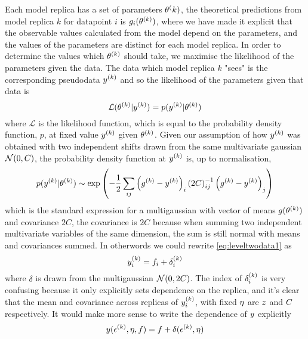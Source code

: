 Each model replica has a set of parameters $\theta^(k)$, the theoretical
predictions from model replica $k$ for datapoint $i$ is
$g_{i}(\theta^{(k)})$, where we have made it explicit that the observable
values calculated from the model depend on the parameters, and the values of the
parameters are distinct for each model replica. In order to determine the values
which $\theta^{(k)}$ should take, we maximise the likelihood of the parameters
given the data. The data which model replica $k$ "sees" is the corresponding
pseudodata $y^{(k)}$ and so the likelihood of the parameters given
that data is
\begin{equation}
    \mathcal{L}(\theta^{(k)} \vert y^{(k)}) = p(y^{(k)} | \theta^{(k)})
\end{equation}
where $\mathcal{L}$ is the likelihood function, which is equal to the probability
density function, $p$, at fixed value $y^{(k)}$ given
$\theta^{(k)}$. Given our assumption of how $y^{(k)}$ was obtained
with two independent shifts drawn from the same multivariate gaussian
$\mathcal{N}(0, C)$, the probability density function at
$y^{(k)}$ is, up to normalisation,
\begin{equation}
    p(y^{(k)} | \theta^{(k)}) \sim
    \exp \left( - \frac{1}{2} \sum_{ij} \left( g^{(k)} - y^{(k)} \right)_i {(2C)}^{-1}_{ij} \left( g^{(k)} - y^{(k)} \right)_j \right)
\end{equation}
which is the standard expression for a multigaussian with vector of means
$g(\theta^{(k)})$ and covariance $2C$, the covariance is $2C$ because
when summing two independent multivariate variables of the same dimension, the
sum is still normal with means and covariances summed. In otherwords we could
rewrite \eqref{eq:leveltwodata1} as
\begin{equation}
    y^{(k)}_{i} = f_i + \delta^{(k)}_{i}
\end{equation}
where $\delta$ is drawn from the multigaussian $\mathcal{N}(0, 2C)$. The
index of $\delta^{(k)}_{i}$ is very confusing because it only explicitly
sets dependence on the replica, and it's clear that the mean and covariance
across replicas of $y^{(k)}_{i}$, with fixed $\eta$ are
$z$ and $C$ respectively. It would make more sense to write the
dependence of $y$ explicitly
\begin{equation}
    y(\epsilon^{(k)}, \eta, f) = f + \delta(\epsilon^{(k)}, \eta)
\end{equation}
